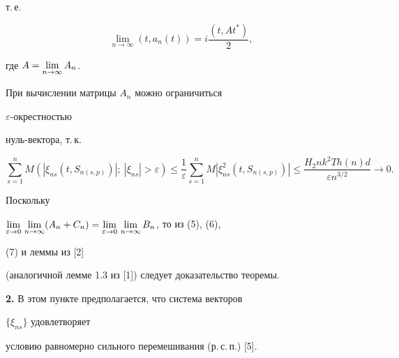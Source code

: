 \begin{pf}
т.\,е. 


\begin{equation} 


\lim_{n\to\infty}(t,a_n(t))=i\frac{(t,A t^*)}{2}, 


\end{equation} 


где $A=\lim\limits_{n\to\infty}A_n$. 


 


При вычислении матрицы $A_n$ можно ограничиться 


$\varepsilon$-окрестностью 


нуль-вектора, т.\,к. 


$$ 


\sum^n_{s=1}M(|\xi_{ns}(t,S_{n(s,p)})|;\ |\xi_{ns}|>\varepsilon)\le 


\frac{1}{\varepsilon}\sum^n_{s=1}M|\xi^2_{ns}(t,S_{n(s,p)})|\le 


\frac{H_2n k^2T h(n)d}{\varepsilon n^{3/2}}\to 0. 


$$ 


 


Поскольку 


$\llim_{\varepsilon\to 0}\,\llim_{n\to\infty}(A_n+C_n)= 


\llim_{\varepsilon\to 0}\,\llim_{n\to\infty}B_n$, то из (5), (6), 


(7) и леммы из [2] 


(аналогичной лемме 1.3 из [1]) следует доказательство теоремы. 


\end{pf} 


 


{\bf 2.} В этом пункте предполагается, что система векторов 


$\{\xi_{ns}\}$ удовлетворяет 


условию равномерно сильного перемешивания (р.\,с.\,п.) [5]. 


 


